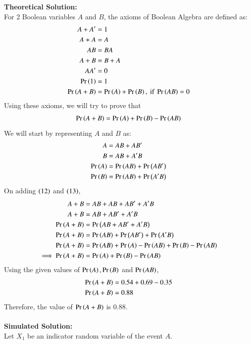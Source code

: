 \documentclass[journal]{IEEEtran}
\begin{document}
\textbf{Theoretical Solution:\\}
For 2 Boolean variables $A$ and $B$, the axioms of Boolean Algebra are defined as:
\begin{align}
	A + A^\prime &= 1\\
	A + A &= A\\
	AB &= BA\\
	A + B &= B + A\\
	AA^\prime &= 0\\
	\Pr\left(1\right) &= 1\\
	\Pr\left(A + B\right) &= \Pr\left(A\right) + \Pr\left(B\right), \text{ if } \Pr\left(AB\right) = 0
\end{align}
Using these axioms, we will try to prove that
\begin{align}
	\Pr\left(A + B\right) = \Pr\left(A\right) + \Pr\left(B\right) - \Pr\left(AB\right)
\end{align}
We will start by representing $A$ and $B$ as:
\begin{align}
	A &= AB + AB^\prime\\
	B &= AB + A^\prime B\\
	\Pr\left(A\right) &= \Pr\left(AB\right) + \Pr\left(AB^\prime\right)\\
	\Pr\left(B\right) &= \Pr\left(AB\right) + \Pr\left(A^\prime B\right)
\end{align}
On adding $\left(12\right)$ and $\left(13\right)$,
\begin{align}
	A + B &= AB + AB + AB^\prime + A^\prime B\\
	A + B &= AB + AB^\prime + A^\prime B\\
	\Pr\left(A + B\right) &= \Pr\left(AB + AB^\prime + A^\prime B\right)\\
	\Pr\left(A + B\right) &= \Pr\left(AB\right) + \Pr\left(AB^\prime\right) + \Pr\left(A^\prime B\right)\\
	\Pr\left(A + B\right) &= \Pr\left(AB\right) + \Pr\left(A\right) - \Pr\left(AB\right) + \Pr\left(B\right) - \Pr\left(AB\right)\\
	\implies \Pr\left(A + B\right) &= \Pr\left(A\right) + \Pr\left(B\right) - \Pr\left(AB\right)
\end{align}
Using the given values of $\Pr\left(A\right), \Pr\left(B\right)$ and $\Pr\left(AB\right)$,
\begin{align}
	\Pr\left(A + B\right) &= 0.54 + 0.69 - 0.35\\
	\Pr\left(A + B\right) &= 0.88
\end{align}
Therefore, the value of $\Pr\left(A + B\right)$ is $0.88$.\\\\
\textbf{Simulated Solution:\\}
Let $X_1$ be an indicator random variable of the event $A$.\\
\end{document}
